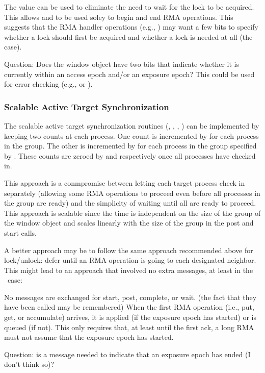 \documentclass{article}
\begin{document}
The  value  can be used to eliminate
the need to wait for the lock to be acquired.  This allows
 and  to be used soley to begin
and end RMA operations.  This suggests that the RMA handler operations
(e.g., ) may want a few bits to specify
whether a lock should first be acquired and whether a lock is needed
at all (the  case).  

Question: Does the window object have two bits that indicate whether it is
currently within an access epoch and/or an exposure epoch?  This could be used
for error checking (e.g.,  or
).

\subsubsection{Scalable Active Target Synchronization}
The scalable active target synchronization routines (,
, , )
can be implemented by keeping two counts at each process.  One count is
incremented by  for each process in the group.  
The other is incremented by  for each process in the
group specified by .  These counts are zeroed by
 and  respectively once all
processes have checked in.

This approach is a conmpromise between letting each target process check in
separately (allowing some RMA operations to proceed even before all processes
in the group are ready) and the simplicity of waiting until all are ready to
proceed.  This approach is scalable since the time is independent on the size
of the group of the window object and scales linearly with the size of the
group in the post and start calls.  

A better approach may be to follow the same approach recommended above for
lock/unlock: defer until an RMA operation is going to each designated
neighbor. This might lead to an approach that involved no extra messages, at
least in the \tcpname\ case:
\begin{tcp}
No messages are exchanged for start, post, complete, or wait.
(the fact that they have been called may be remembered)
When the first RMA operation (i.e., put, get, or accumulate) arrives, it is 
applied (if the exposure epoch has started) or is queued (if not).  This only
requires that, at least until the first ack, a long RMA must not assume that
the exposure epoch has started.

Question: is a message needed to indicate that an exposure epoch has ended (I
don't think so)?
\end{tcp} 
\end{document}
